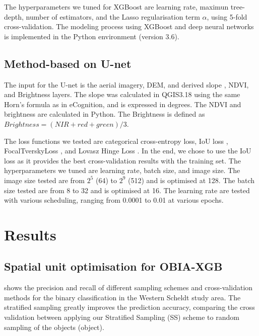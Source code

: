 \documentclass{isprs} %
\begin{document}
The hyperparameters we tuned for XGBoost are learning rate, maximun tree-depth, number of estimators, and the Lasso regularisation term $\alpha$, using 5-fold cross-validation. The modeling process using XGBoost and deep neural networks is implemented in the Python environment (version 3.6). 

\subsection{Method-based on U-net}

The input for the U-net is the aerial imagery, DEM, and derived slope \citep{horn1981hill}, NDVI, and  Brightness layers. The slope was calculated in QGIS3.18 using the same Horn's formula \citep{horn1981hill} as in eCognition, and is expressed in degrees. The NDVI and brightness are calculated in Python. The Brightness is defined as $Brightness =  (NIR+red+green)/3$.
 
The loss functions we tested are categorical cross-entropy loss, IoU loss \citep{van2019deep}, FocalTverskyLoss \citep{abraham2019novel}, and Lovasz Hinge Loss \citep{berman2018lovasz}. In the end, we chose to use the IoU loss as it provides the best cross-validation results with the training set. The hyperparameters we tuned are learning rate, batch size, and image size. The image size tested are from $2^5$ (64) to $2^9$ (512) and is optimised at 128. The batch size tested are from 8 to 32 and is optimised at 16. The learning rate are tested with various scheduling, ranging from 0.0001 to 0.01 at various epochs. 
 

\section{Results}
\label{sec:results}

\subsection{Spatial unit optimisation for OBIA-XGB}
\label{sec:suo}

  shows the precision and recall of different sampling schemes and cross-validation methods for the binary classification in the Western Scheldt study area. The stratified sampling greatly improves the prediction accuracy, comparing the cross validation between applying our Stratified Sampling (SS) scheme to random sampling of the objects (object).
 
\end{document}
